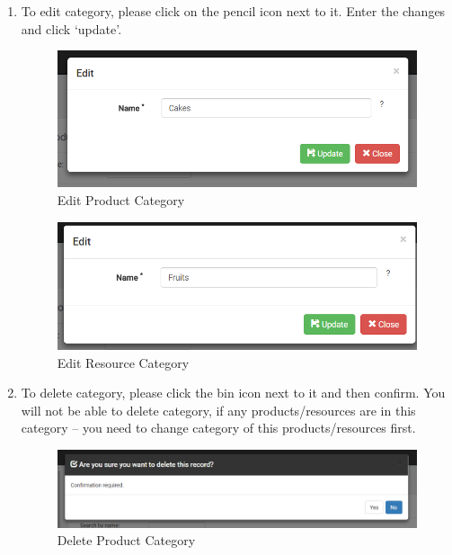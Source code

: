 \documentclass[a4paper,11pt,twoside]{report}
\theoremstyle{definition}
\begin{document}
\begin{enumerate}
\begin{enumerate}
\item To edit category, please click on the pencil icon next to it. Enter the changes and click ‘update’. 


\begin{figure}[h!]
\begin{center}
\includegraphics[width=\textwidth]{AS/categories/product/3}
\end{center}
\caption{Edit Product Category}
\end{figure}

\begin{figure}[h!]
\begin{center}
\includegraphics[width=\textwidth]{AS/categories/resource/3}
\end{center}
\caption{Edit Resource Category}
\end{figure}

\item To delete category, please click the bin icon next to it and then confirm. You will not be able to delete category, if any products/resources are in this category – you need to change category of this products/resources first.

\begin{figure}[h!]
\begin{center}
\includegraphics[width=\textwidth]{AS/categories/product/4}
\end{center}
\caption{Delete Product Category}
\end{figure}


\end{enumerate}
\end{enumerate}
\end{document}
